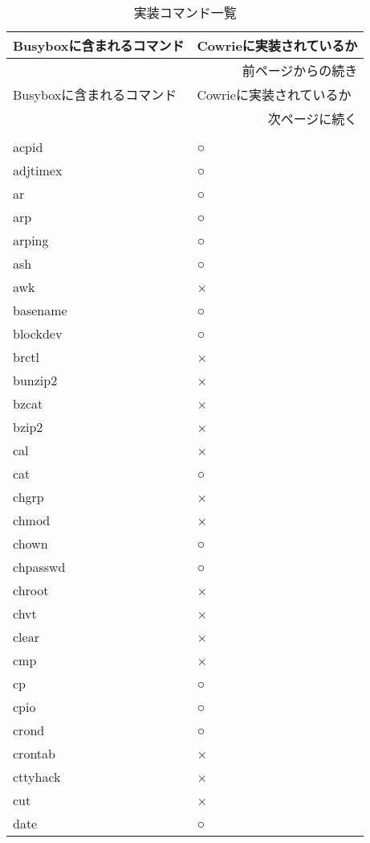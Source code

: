 \begin{longtable}{p{60mm}p{60mm}}
 \caption{実装コマンド一覧}
 \label{table:command} \\
 \hline
 Busyboxに含まれるコマンド & Cowrieに実装されているか \\ \hline\hline
 \endfirsthead
 \multicolumn{2}{r}{前ページからの続き} \\ \hline
 Busyboxに含まれるコマンド & Cowrieに実装されているか \\ \hline\hline
 \endhead
 \hline
 \multicolumn{2}{r}{次ページに続く} \\
 \endfoot
 \hline
 \multicolumn{2}{r}{以上} \\
 \endlastfoot
acpid & ○ \\ \hline
adjtimex & ○ \\ \hline
ar & ○ \\ \hline
arp & ○ \\ \hline
arping & ○ \\ \hline
ash & ○ \\ \hline
awk & × \\ \hline
basename & ○ \\ \hline
blockdev & ○ \\ \hline
brctl & × \\ \hline
bunzip2 & × \\ \hline
bzcat & × \\ \hline
bzip2 & × \\ \hline
cal & × \\ \hline
cat & ○ \\ \hline
chgrp & × \\ \hline
chmod & × \\ \hline
chown & ○ \\ \hline
chpasswd & ○ \\ \hline
chroot & × \\ \hline
chvt & × \\ \hline
clear & × \\ \hline
cmp & × \\ \hline
cp & ○ \\ \hline
cpio & ○ \\ \hline
crond & ○ \\ \hline
crontab & × \\ \hline
cttyhack & × \\ \hline
cut & × \\ \hline
date & ○ \\ \hline

\end{longtable}
